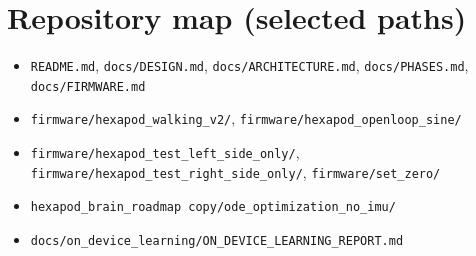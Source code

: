 \documentclass[11pt]{article}
\begin{document}



\appendix
\section{Repository map (selected paths)}
\begin{itemize}
  \item \texttt{README.md}, \texttt{docs/DESIGN.md}, \texttt{docs/ARCHITECTURE.md}, \texttt{docs/PHASES.md}, \texttt{docs/FIRMWARE.md}
  \item \texttt{firmware/hexapod\_walking\_v2/}, \texttt{firmware/hexapod\_openloop\_sine/}
  \item \texttt{firmware/hexapod\_test\_left\_side\_only/}, \texttt{firmware/hexapod\_test\_right\_side\_only/}, \texttt{firmware/set\_zero/}
  \item \texttt{hexapod\_brain\_roadmap copy/ode\_optimization\_no\_imu/}
  \item \texttt{docs/on\_device\_learning/ON\_DEVICE\_LEARNING\_REPORT.md}
\end{itemize}
\end{document}
